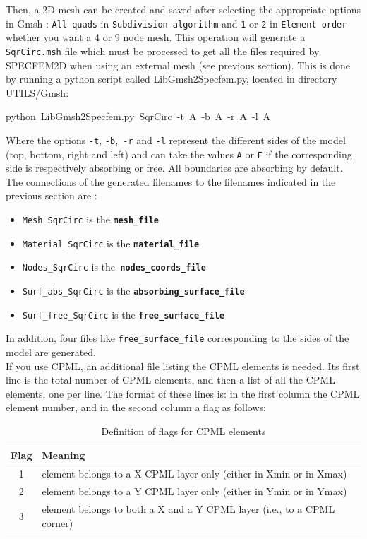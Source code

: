 \documentclass[oneside,english,onecolumn,letterpaper]{book}
\newenvironment{lyxcode}
{\begin{list}{}{
\setlength{\rightmargin}{\leftmargin}
\setlength{\listparindent}{0pt}%
\raggedright
\setlength{\itemsep}{0pt}
\setlength{\parsep}{0pt}
\normalfont\ttfamily}%
 \item[]}
{\end{list}}
\begin{document}
Then, a 2D mesh can be created and saved after selecting the appropriate
options in Gmsh : \texttt{All quads} in \texttt{Subdivision algorithm}
and \texttt{1} or \texttt{2} in \texttt{Element order} whether you
want a 4 or 9 node mesh. This operation will generate a \texttt{SqrCirc.msh}
file which must be processed to get all the files required by SPECFEM2D
when using an external mesh (see previous section). This is done by
running a python script called LibGmsh2Specfem.py, located in directory UTILS/Gmsh:
\begin{lyxcode}
python~LibGmsh2Specfem.py~SqrCirc~-t~A~-b~A~-r~A~-l~A
\end{lyxcode}
Where the options \texttt{-t}, \texttt{-b},\texttt{ -r} and \texttt{-l}
represent the different sides of the model (top, bottom, right and
left) and can take the values \texttt{A} or \texttt{F} if the corresponding
side is respectively absorbing or free. All boundaries are absorbing
by default. The connections of the generated filenames to the filenames
indicated in the previous section are :
\begin{itemize}
\item \texttt{Mesh\_SqrCirc} is the \texttt{\textbf{mesh\_file}}
\item \texttt{Material\_SqrCirc} is the \texttt{\textbf{material\_file}}
\item \texttt{Nodes\_SqrCirc} is the\texttt{ }\texttt{\textbf{nodes\_coords\_file}}
\item \texttt{Surf\_abs\_SqrCirc} is the \texttt{\textbf{absorbing\_surface\_file}}
\item \texttt{Surf\_free\_SqrCirc} is the \texttt{\textbf{free\_surface\_file}}
\end{itemize}
In addition, four files like \texttt{free\_surface\_file} corresponding
to the sides of the model are generated.\\

If you use CPML, an additional file listing the CPML elements is needed.
Its first line is the total number of
CPML elements, and then a list of all the CPML elements, one per line.
The format of these lines is: in the first column the CPML element number, and in the second column a flag as follows:

\begin{table}[hb]
\caption{Definition of flags for CPML elements}
\centering
\begin{tabular}{c l}
\hline\hline
Flag& Meaning\\ [0.5ex]
\hline
1 & element belongs to a X CPML layer only (either in Xmin or in Xmax)\\
2 & element belongs to a Y CPML layer only (either in Ymin or in Ymax)\\
3 & element belongs to both a X and a Y CPML layer (i.e., to a CPML corner)\\ [1ex]
\hline
\end{tabular}
\label{table:CPMLflags}
\end{table}
\end{document}
